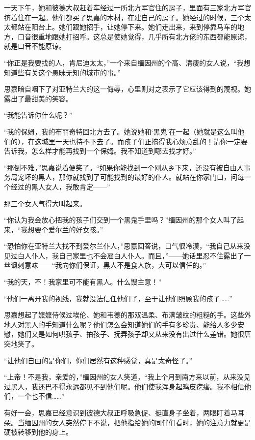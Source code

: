 \par 一天下午，她和彼德大叔赶着车经过一所北方军官住的房子，里面有三家北方军官挤着住在一起。他们都买了思嘉的木材，在建自己的房子。她经过的时候，三个太太都站在阳台上。她们跟她招手，让她停下来。她们走出来，来到停靠马车的地方，口音很重地跟她打招呼。这总是使她觉得，几乎所有北方佬的东西都能原谅，就是口音不能原谅。
\par “你正是我要找的人，肯尼迪太太，”一个来自缅因州的个高、清瘦的女人说，“我想知道些有关这个愚昧无知的城市的事。”
\par 思嘉暗自咽下了对亚特兰大的这一侮辱，心里则对之表示了它应该得到的蔑视。她露出了最甜美的笑容。
\par “我能告诉你什么呢？”
\par “我的保姆，我的布丽奇特回北方去了。她说她和‘黑鬼’在一起（她就是这么叫他们的），在这城里一天也待不下去了。而孩子们正搞得我心烦意乱的！请你一定要告诉我，怎么样才能再找到一个保姆。我不知道到哪去找才好。”
\par “那倒不难，”思嘉说着便笑了。“如果你能找到一个刚从乡下来，还没有被自由人事务局宠坏的黑人，那你就找到了可能找到的最好的仆人。就站在你家门口，问每一个经过的黑人女人，我敢肯定——”
\par 那三个女人气得大叫起来。
\par “你认为我会放心把我的孩子们交到一个黑鬼手里吗？”缅因州的那个女人叫了起来，“我想要个爱尔兰的好女孩。”
\par “恐怕你在亚特兰大找不到爱尔兰仆人，”思嘉回答说，口气很冷漠，“我自己从来没见过白人仆人，我自己家里也不会雇白人仆人。而且，”——她话里忍不住露出了一丝讽刺意味——“我向你们保证，黑人不是食人族，大可以信任的。”
\par “我的天，不！我家里可不能有黑人。什么馊主意！”
\par “他们一离开我的视线，我就没法信任他们了，至于让他们照顾我的孩子……”
\par 思嘉想起了嬷嬷侍候过埃伦、她和韦德的那双温柔、布满皱纹的粗糙的手。这些外地人对黑人的手知道什么呢？他们怎么会知道她们的手有多珍贵、能给人多少安慰，她们又是如何哄孩子、拍孩子、抚弄孩子却又从来没有出过什么差错。她很唐突地笑了。
\par “让他们自由的是你们，你们居然有这种感觉，真是太奇怪了。”
\par “上帝！不是我，亲爱的，”缅因州的女人笑道，“我上个月到南方来以前，从来没见过黑人，我还巴不得永远都见不到他们呢。他们使我浑身起鸡皮疙瘩。我不相信他们，一个也不信……”
\par 有好一会，思嘉已经意识到彼德大叔正呼吸急促、挺直身子坐着，两眼盯着马耳朵。当缅因州的女人突然停下不说，把他指给她的同伴们看时，她的注意力就更是硬被转移到他的身上。
